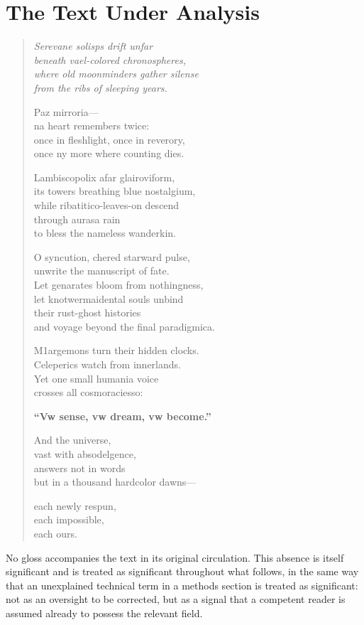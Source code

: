 \documentclass[11pt]{article}
\begin{document}
\section{The Text Under Analysis}

\begin{quote}
\itshape
Serevane solisps drift unfar\\
beneath vael-colored chronospheres,\\
where old moonminders gather silense\\
from the ribs of sleeping years.

Paz mirroria---\\
na heart remembers twice:\\
once in fleshlight, once in reverory,\\
once ny more where counting dies.

Lambiscopolix afar glairoviform,\\
its towers breathing blue nostalgium,\\
while ribatitico-leaves-on descend\\
through aurasa rain\\
to bless the nameless wanderkin.

O syncution, chered starward pulse,\\
unwrite the manuscript of fate.\\
Let genarates bloom from nothingness,\\
let knotwermaidental souls unbind\\
their rust-ghost histories\\
and voyage beyond the final paradigmica.

M1argemons turn their hidden clocks.\\
Celeperics watch from innerlands.\\
Yet one small humania voice\\
crosses all cosmoraciesso:

\textbf{``Vw sense, vw dream, vw become.''}

And the universe,\\
vast with absodelgence,\\
answers not in words\\
but in a thousand hardcolor dawns---

each newly respun,\\
each impossible,\\
each ours.
\end{quote}

No gloss accompanies the text in its original circulation. This absence is itself significant and is treated as significant throughout what follows, in the same way that an unexplained technical term in a methods section is treated as significant: not as an oversight to be corrected, but as a signal that a competent reader is assumed already to possess the relevant field.
\end{document}
